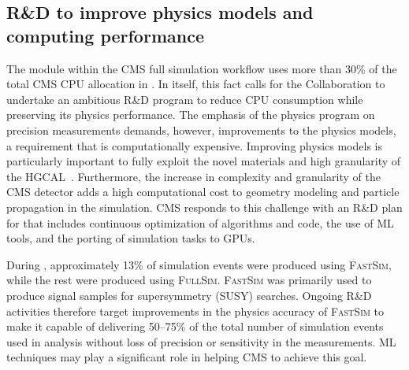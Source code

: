 \subsection{R\&D to improve physics models and computing performance}
\label{sec:RDDetSim}


The \GEANTfour module within the CMS full simulation workflow uses more than 30\% of the total CMS \gls{CPU} allocation in \RunThree. In itself, this fact calls for the \GEANTfour Collaboration to undertake an ambitious R\&D program to reduce \gls{CPU} consumption while preserving its physics performance.
The emphasis of the \PhaseTwo physics program on precision measurements demands, however, improvements to the \GEANTfour physics models, a requirement that is computationally expensive. Improving physics models is particularly important to fully exploit the novel materials and high granularity of the \gls{HGCAL}~\cite{CMS:2019MIPTDR, Apostolakis:2022nnf}. Furthermore, the increase in complexity and granularity of the CMS \PhaseTwo detector adds a high computational cost to geometry modeling and particle propagation in the simulation. CMS responds to this challenge with an R\&D plan for \PhaseTwo that includes continuous optimization of algorithms and code, the use of \gls{ML} tools, and the porting of simulation tasks to \glspl{GPU}. 

During \RunTwo, approximately 13\% of simulation events were produced using \textsc{FastSim}, while the rest were produced using \textsc{FullSim}. \textsc{FastSim} was primarily used to produce signal samples for supersymmetry (SUSY) searches. 
Ongoing R\&D activities therefore target improvements in the physics accuracy of \textsc{FastSim} to make it capable of delivering 50--75\% of the total number of simulation events used in analysis without loss of precision or sensitivity in the measurements. \gls{ML} techniques may play a significant role in helping CMS to achieve this goal.

